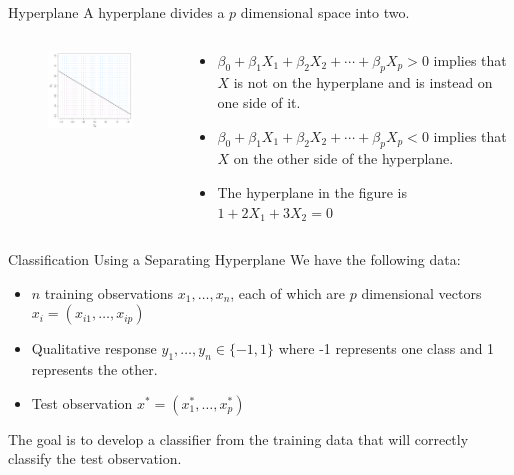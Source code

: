 \documentclass[
  ignorenonframetext,
  aspectratio=169,
]{beamer}
\begin{document}
\begin{frame}{Hyperplane}
\protect\hypertarget{hyperplane-1}{}
A hyperplane divides a \(p\) dimensional space into two.

\begin{columns}[T]
\begin{column}{0.5\textwidth}
\begin{figure}

{\centering \includegraphics[width=2.83333in,height=\textheight]{images/hyperplane.png}

}

\end{figure}
\end{column}

\begin{column}{0.5\textwidth}
\begin{itemize}
\item
  \(\beta_{0}+\beta_{1} X_{1}+\beta_{2} X_{2}+\cdots+\beta_{p} X_{p}>0\)
  implies that \(X\) is not on the hyperplane and is instead on one side
  of it.
\item
  \(\beta_{0}+\beta_{1} X_{1}+\beta_{2} X_{2}+\cdots+\beta_{p} X_{p}<0\)
  implies that \(X\) on the other side of the hyperplane.
\item
  The hyperplane in the figure is \(1 + 2X_1 + 3X_2 = 0\)
\end{itemize}
\end{column}
\end{columns}
\end{frame}

\begin{frame}{Classification Using a Separating Hyperplane}
\protect\hypertarget{classification-using-a-separating-hyperplane}{}
We have the following data:

\begin{itemize}
\item
  \(n\) training observations \(x_1, \dots, x_n\), each of which are
  \(p\) dimensional vectors \(x_i = (x_{i1}, \dots, x_{ip})\)
\item
  Qualitative response \(y_1, \dots, y_n \in \{-1, 1\}\) where -1
  represents one class and 1 represents the other.
\item
  Test observation \(x^* = (x^*_1, \dots, x^*_p)\)
\end{itemize}

The goal is to
\alert{develop a classifier from the training data that will correctly classify the test observation}.
\end{frame}
\end{document}

